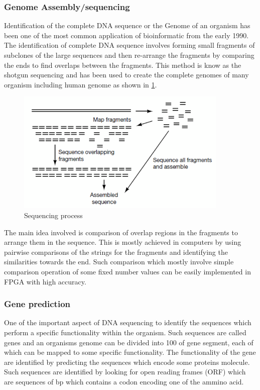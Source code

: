 \documentclass[12pt,twoside]{article}
\begin{document}
\subsubsection{Genome Assembly/sequencing}

Identification of the complete DNA sequence or the Genome of an organism has been one of the most common
application of bioinformatic from the early 1990. The identification of complete DNA sequence involves
forming small fragments of subclones of the large sequences and then re-arrange the fragments by comparing
the ends to find overlaps between the fragments\cite[Chapter 2, Genome sequencing]{mount_bioinformatics:_2004}.
This method is know as the shotgun sequencing and has been used to create the complete genomes of many organism
including human genome as shown in \cref{fig:sequence}.

\begin{figure}%
    \centering
    \includegraphics[width=0.9\textwidth]{fig/sequence}
    \caption{Sequencing process \cite[Figure 2.4]{mount_bioinformatics:_2004}}
    \label{fig:sequence}
\end{figure}

The main idea involved is comparison of overlap regions in the fragments to arrange them in the sequence. This
is mostly achieved in computers by using pairwise comparisons of the strings for the fragments and identifying
the similarities towards the end. Such comparison which mostly involve simple comparison operation of some
fixed number values can be easily implemented in FPGA with high accuracy.

\subsubsection{Gene prediction}

One of the important aspect of DNA sequencing to identify the sequences which perform a specific functionality
within the organism. Such sequences are called genes and an organisms genome can be divided into 100 of gene
segment, each of which can be mapped to some specific functionality. The functionality of the gene are identified
by predicting the sequences which encode some proteins molecule. Such sequences are identified by looking for
open reading frames (ORF) which are sequences of bp which contains a codon encoding one of the ammino acid.
\end{document}
